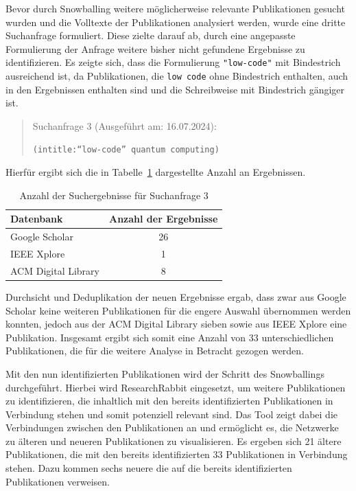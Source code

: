 Bevor durch Snowballing weitere möglicherweise relevante Publikationen gesucht wurden und die Volltexte der Publikationen analysiert werden, 
wurde eine dritte Suchanfrage formuliert. Diese zielte darauf ab, durch eine angepasste Formulierung der Anfrage weitere bisher nicht gefundene 
Ergebnisse zu identifizieren. Es zeigte sich, dass die Formulierung \texttt{"low-code"} mit Bindestrich ausreichend ist, da Publikationen, die
\texttt{low code} ohne Bindestrich enthalten, auch in den Ergebnissen enthalten sind und die Schreibweise mit Bindestrich gängiger ist. 

\begin{quote}
    Suchanfrage 3 (Ausgeführt am: 16.07.2024):

    \texttt{(intitle:``low-code'' quantum computing)} 

\end{quote}

Hierfür ergibt sich die in Tabelle~\ref{tab:search_3_results} dargestellte Anzahl an Ergebnissen. 

\begin{table}[h!]
    \centering
    \caption{Anzahl der Suchergebnisse für Suchanfrage 3}
    \label{tab:search_3_results}
    \begin{tabular}{|l|c|}
    \hline
    \textbf{Datenbank} & \textbf{Anzahl der Ergebnisse} \\ \hline
    Google Scholar & 26 \\ \hline
    IEEE Xplore & 1 \\ \hline
    ACM Digital Library & 8 \\ \hline
    \end{tabular}
\end{table}

Durchsicht und Deduplikation der neuen Ergebnisse ergab, dass zwar aus Google Scholar keine weiteren Publikationen für die engere Auswahl übernommen werden konnten, 
jedoch aus der ACM Digital Library sieben sowie aus IEEE Xplore eine Publikation. Insgesamt ergibt sich somit eine Anzahl von 33 
unterschiedlichen Publikationen, die für die weitere Analyse in Betracht gezogen werden. 

Mit den nun identifizierten Publikationen wird der Schritt des Snowballings durchgeführt. Hierbei wird ResearchRabbit eingesetzt, um 
weitere Publikationen zu identifizieren, die inhaltlich mit den bereits identifizierten Publikationen in Verbindung stehen und somit 
potenziell relevant sind. Das Tool zeigt dabei die Verbindungen zwischen den Publikationen an und ermöglicht es, die Netzwerke 
zu älteren und neueren Publikationen zu visualisieren. Es ergeben sich 21 ältere Publikationen, die mit den bereits identifizierten 33 
Publikationen in Verbindung stehen. Dazu kommen sechs neuere die auf die bereits identifizierten Publikationen verweisen. 

